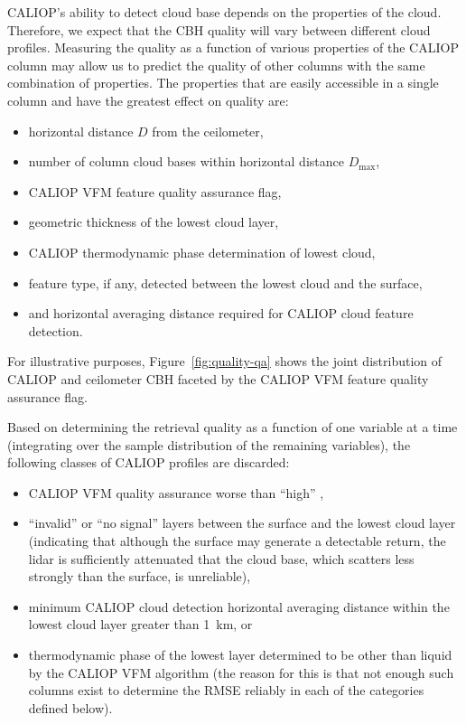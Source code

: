 \documentclass[essd,manuscript]{copernicus}\usepackage[]{graphicx}\usepackage[]{color}
\begin{document}
CALIOP's ability to detect cloud base depends on the properties of the cloud.
Therefore, we expect that the CBH quality will vary between
different cloud profiles.  Measuring the quality as a function of various
properties of the CALIOP column may allow us to predict the quality of other
columns with the same combination of properties.  The properties that are easily
accessible in a single column and have the greatest effect on quality are:
\begin{itemize}
\item horizontal distance $D$ from the ceilometer,
\item number of column cloud bases within horizontal distance $D_\text{max}$,
\item CALIOP VFM feature quality assurance flag,
\item geometric thickness of the lowest cloud layer,
\item CALIOP thermodynamic phase determination of lowest cloud,
\item feature type, if any, detected between the lowest cloud and the surface,
\item and horizontal averaging distance required for CALIOP cloud feature
  detection.
\end{itemize}
For illustrative purposes, Figure~\ref{fig:quality-qa} shows the joint
distribution of CALIOP and ceilometer CBH faceted by the CALIOP
VFM feature quality assurance flag.  

Based on determining the retrieval quality as a function of one variable at a
time (integrating over the sample distribution of the remaining variables), the
following classes of CALIOP profiles are discarded:
\begin{itemize}
\item CALIOP VFM quality assurance worse than ``high'' ,
\item ``invalid'' or ``no signal'' layers between the surface and the lowest
  cloud layer (indicating that although the surface may generate a detectable
  return, the lidar is sufficiently attenuated that the cloud base, which
  scatters less strongly than the surface, is unreliable),
\item minimum CALIOP cloud detection horizontal averaging distance within the
  lowest cloud layer greater than 1~km, or
\item thermodynamic phase of the lowest layer determined to be other than liquid
  by the CALIOP VFM algorithm (the reason for this is that not enough such
  columns exist to determine the RMSE reliably in each of the categories defined
  below).
\end{itemize}
\end{document}
